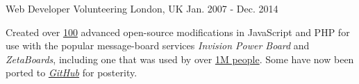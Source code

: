 \begin{cventries}
  \cventry
    {} %
    {Web Developer} %
    {}
    {Volunteering} %
    {London, UK} %
    {Jan. 2007 - Dec. 2014} %
    {
      \begin{cvitems} %
        \item {Created over \underline{100} advanced open-source modifications in JavaScript and PHP for use with the popular message-board services \textit{Invision Power Board} and \textit{ZetaBoards}, including one that was used by over \underline{1M people}. Some have now been ported to \href{https://github.com/KeirSimmons/ZetaBoards}{\emph{GitHub}} for posterity.}
      \end{cvitems}
    }



\end{cventries}